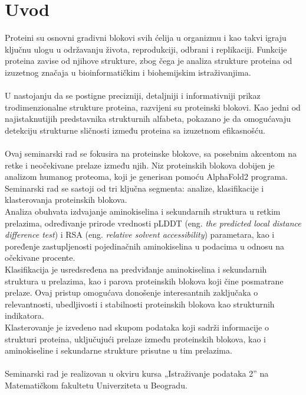 \documentclass[a4paper,12pt]{article}
\begin{document}
\section{Uvod}
Proteini su osnovni gradivni blokovi svih ćelija u organizmu i kao takvi igraju ključnu ulogu u održavanju života, reprodukciji, odbrani i replikaciji. Funkcije proteina zavise od njihove strukture, zbog čega je analiza strukture proteina od izuzetnog značaja u bioinformatičkim i biohemijskim istraživanjima.\\
\\
U nastojanju da se postigne precizniji, detaljniji i informativniji prikaz trodimenzionalne strukture proteina, razvijeni su proteinski blokovi. Kao jedni od najistaknutijih predstavnika strukturnih alfabeta, pokazano je da omogućavaju detekciju strukturne sličnosti između proteina sa izuzetnom efikasnošću.\\
\\
Ovaj seminarski rad se fokusira na proteinske blokove, sa posebnim akcentom na retke i neočekivane prelaze između njih. Niz proteinskih blokova dobijen je analizom humanog proteoma, koji je generisan pomoću AlphaFold2 programa. Seminarski rad se sastoji od tri ključna segmenta: analize, klasifikacije i klasterovanja proteinskih blokova.\\
Analiza obuhvata izdvajanje aminokiselina i sekundarnih struktura u retkim prelazima, određivanje prirode vrednosti pLDDT (eng. \textit{the predicted local distance difference test}) i RSA (eng. \textit{relative solvent accessibility}) parametara, kao i poređenje zastupljenosti pojedinačnih aminokiselina u podacima u odnosu na očekivane procente. \\
Klasifikacija je usredsređena na predviđanje aminokiselina i sekundarnih struktura u prelazima, kao i parova proteinskih blokova koji čine posmatrane prelaze. Ovaj pristup omogućava donošenje interesantnih zaključaka o relevantnosti, ubedljivosti i stabilnosti proteinskih blokova kao strukturnih indikatora. \\
Klasterovanje je izvedeno nad skupom podataka koji sadrži informacije o strukturi proteina, uključujući prelaze između proteinskih blokova, kao i aminokiseline i sekundarne strukture prisutne u tim prelazima. \\
\\
Seminarski rad je realizovan u okviru kursa „Istraživanje podataka 2” na Matematičkom fakultetu Univerziteta u Beogradu.
\newpage
\end{document}
